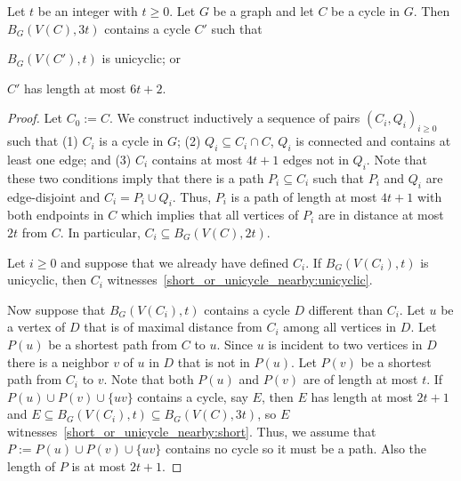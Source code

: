 \documentclass{patmorin}
\begin{document}
\begin{lem}\label{short_or_unicycle_nearby}
  Let $t$ be an integer with $t\ge 0$.
  Let $G$ be a graph and let $C$ be a cycle in $G$.
  Then $B_G(V(C),3t)$ contains a cycle $C'$ such that
  \begin{compactenum}[(a)]
    \item $B_G(V(C'),t)$ is unicyclic; or\label{short_or_unicycle_nearby:unicyclic}
    \item $C'$ has length at most $6t+2$.\label{short_or_unicycle_nearby:short}
  \end{compactenum}
\end{lem}

\begin{proof}
  Let $C_0:=C$.
  We construct inductively a sequence of pairs $(C_i,Q_i)_{i\geq0}$ such that
  (1) $C_i$ is a cycle in $G$;
  (2) $Q_i\subseteq C_i\cap C$, $Q_i$ is connected and contains at least one edge; and
  (3) $C_i$ contains at most $4t+1$ edges not in $Q_i$.
  Note that these two conditions imply that there is a path $P_i\subseteq C_i$  such that
  $P_i$ and $Q_i$ are edge-disjoint and $C_i=P_i\cup Q_i$.
  Thus, $P_i$ is a path of length at most $4t+1$ with both endpoints in $C$
  which implies that all vertices of $P_i$ are in distance at most $2t$ from $C$.
  In particular, $C_i\subseteq B_G(V(C),2t)$.

  Let $i\geq0$ and suppose that we already have defined $C_i$.
  If $B_G(V(C_i),t)$ is unicyclic, then $C_i$ witnesses~\eqref{short_or_unicycle_nearby:unicyclic}.

  Now suppose that $B_G(V(C_i),t)$ contains a cycle $D$ different than $C_i$.
  Let $u$ be a vertex of $D$ that is of maximal distance from $C_i$ among all vertices in $D$.
  Let $P(u)$ be a shortest path from $C$ to $u$.
  Since $u$ is incident to two vertices in $D$ there is a neighbor $v$ of $u$ in $D$ that is not in $P(u)$.
  Let $P(v)$ be a shortest path from $C_i$ to $v$.
  Note that both $P(u)$ and $P(v)$ are of length at most $t$.
  If $P(u)\cup P(v)\cup\{uv\}$ contains a cycle, say $E$, then $E$ has length at most $2t+1$ and $E\subseteq B_G(V(C_i),t)\subseteq B_G(V(C),3t)$, so $E$ witnesses~\eqref{short_or_unicycle_nearby:short}.
  Thus, we assume that $P:=P(u)\cup P(v)\cup\{uv\}$ contains no cycle so it must be a path.
  Also the length of $P$ is at most $2t+1$.


\end{proof}
\end{document}
